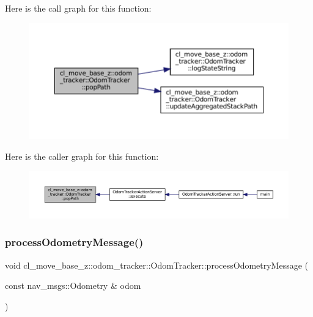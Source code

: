 Here is the call graph for this function\+:
\nopagebreak
\begin{figure}[H]
\begin{center}
\leavevmode
\includegraphics[width=350pt]{classcl__move__base__z_1_1odom__tracker_1_1OdomTracker_a2749e5cd0443423d50864a0166b078b9_cgraph}
\end{center}
\end{figure}
Here is the caller graph for this function\+:
\nopagebreak
\begin{figure}[H]
\begin{center}
\leavevmode
\includegraphics[width=350pt]{classcl__move__base__z_1_1odom__tracker_1_1OdomTracker_a2749e5cd0443423d50864a0166b078b9_icgraph}
\end{center}
\end{figure}
\mbox{\label{classcl__move__base__z_1_1odom__tracker_1_1OdomTracker_a12c5a839cfde2e8f2f55a5e0c9647b18}} 
\subsubsection{\texorpdfstring{process\+Odometry\+Message()}{processOdometryMessage()}}
{\footnotesize\ttfamily void cl\+\_\+move\+\_\+base\+\_\+z\+::odom\+\_\+tracker\+::\+Odom\+Tracker\+::process\+Odometry\+Message (\begin{DoxyParamCaption}\item[{const nav\+\_\+msgs\+::\+Odometry \&}]{odom }\end{DoxyParamCaption})\hspace{0.3cm}{\ttfamily [virtual]}}



